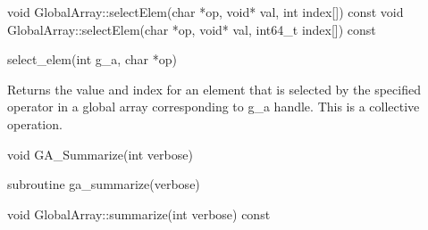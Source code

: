 \documentclass[12pt]{article}
\begin{document}
\begin{cxxapi}
\begin{cxxcode}
void GlobalArray::selectElem(char *op, void* val, int index[]) const
void GlobalArray::selectElem(char *op, void* val, int64_t index[]) const
\end{cxxcode}
\begin{funcargs}
\end{funcargs}
\end{cxxapi}


\begin{pyapi}
\begin{pycode}
select_elem(int g_a, char *op)  
\end{pycode}
\end{pyapi} 

\gcoll

\begin{desc}

Returns the value and index for an element that is selected by the 
specified operator in a global array corresponding to g_a handle.
This is a collective operation.
\end{desc}


\begin{capi}
\begin{ccode}
void GA_Summarize(int verbose)
\end{ccode}
\begin{funcargs}
\end{funcargs}
\end{capi}

\begin{fapi}
\begin{fcode}
subroutine ga_summarize(verbose)
\end{fcode}
\begin{funcargs}
\end{funcargs}
\end{fapi}

\begin{cxxapi}
\begin{cxxcode}
void GlobalArray::summarize(int verbose) const
\end{cxxcode}
\begin{funcargs}
\end{funcargs}
\end{cxxapi}
\end{document}
